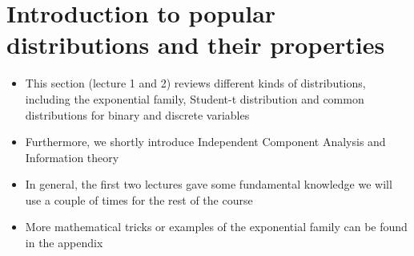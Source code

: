 \section{Introduction to popular distributions and their properties}
\begin{itemize}
	\item This section (lecture 1 and 2) reviews different kinds of distributions, including the exponential family, Student-t distribution and common distributions for binary and discrete variables
	\item Furthermore, we shortly introduce Independent Component Analysis and Information theory
	\item In general, the first two lectures gave some fundamental knowledge we will use a couple of times for the rest of the course
	\item More mathematical tricks or examples of the exponential family can be found in the appendix
\end{itemize}
